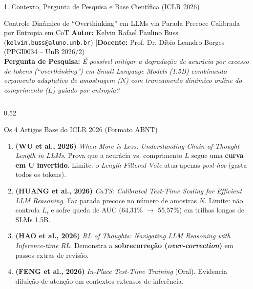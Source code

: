 \documentclass[aspectratio=169,10pt]{beamer}
\begin{document}
\begin{frame}{1. Contexto, Pergunta de Pesquisa e Base Científica (ICLR 2026)}
\vspace{-4pt}
\begin{block}{\small Controle Dinâmico de ``Overthinking'' em LLMs via Parada Precoce Calibrada por Entropia em CoT}
\scriptsize \textbf{Autor:} Kelvin Rafael Paulino Buss (\texttt{kelvin.buss@aluno.unb.br}) \quad|\quad \textbf{Docente:} Prof. Dr. Díbio Leandro Borges (PPGI0034 -- UnB 2026/2)\\
\textbf{Pergunta de Pesquisa:} \textit{É possível mitigar a degradação de acurácia por excesso de tokens (``overthinking'') em Small Language Models (1.5B) combinando orçamento adaptativo de amostragem ($N$) com truncamento dinâmico online do comprimento ($L$) guiado por entropia?}
\end{block}
\vspace{-4pt}
\begin{columns}[T]
\begin{column}{0.52\textwidth}
\begin{exampleblock}{\footnotesize Os 4 Artigos Base do ICLR 2026 (Formato ABNT)}
\tiny
\begin{enumerate}
    \item \textbf{(WU et al., 2026)} \textit{When More is Less: Understanding Chain-of-Thought Length in LLMs}. Prova que a acurácia vs. comprimento $L$ segue uma \textbf{curva em U invertido}. Limite: o \textit{Length-Filtered Vote} atua apenas \textit{post-hoc} (gasta todos os tokens).
    \item \textbf{(HUANG et al., 2026)} \textit{CaTS: Calibrated Test-Time Scaling for Efficient LLM Reasoning}. Faz parada precoce no número de amostras $N$. Limite: não controla $L_i$ e sofre queda de AUC (64,31\% $\to$ 55,57\%) em trilhas longas de SLMs 1.5B.
    \item \textbf{(HAO et al., 2026)} \textit{RL of Thoughts: Navigating LLM Reasoning with Inference-time RL}. Demonstra a \textbf{sobrecorreção (\textit{over-correction})} em passos extras de revisão.
    \item \textbf{(FENG et al., 2026)} \textit{In-Place Test-Time Training} (Oral). Evidencia diluição de atenção em contextos extensos de inferência.
\end{enumerate}

\end{exampleblock}
\end{column}
\end{columns}
\end{frame}
\end{document}
